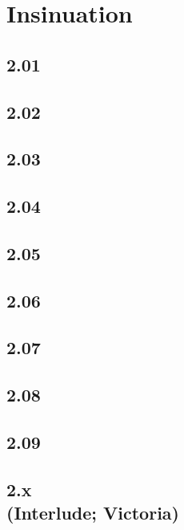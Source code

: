 \part{Insinuation}
\chapter{2.01}


\chapter{2.02}


\chapter{2.03}


\chapter{2.04}


\chapter{2.05}


\chapter{2.06}


\chapter{2.07}


\chapter{2.08}


\chapter{2.09}


\chapter[2.x (Interlude; Victoria)]{2.x\\(Interlude; Victoria)}

